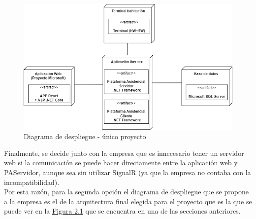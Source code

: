 \begin{figure}[H]
    \centering
    \includegraphics[width=15cm]{Imagenes/Arquitectura-despliegue-3}
    \caption{Diagrama de despliegue - único proyecto}
    \label{fig:despliegue-3}
\end{figure}

Finalmente, se decide junto con la empresa que es innecesario tener un servidor web si la comunicación se puede hacer directamente entre la aplicación web y PAServidor, aunque sea sin utilizar SignalR (ya que la empresa no contaba con la incompatibilidad).\\

Por esta razón, para la segunda opción el diagrama de despliegue que se propone a la empresa es el de la arquitectura final elegida para el proyecto que es la que se puede ver en la \hyperref[fig:despliegue]{Figura 2.1} que se encuentra en una de las secciones anteriores.








